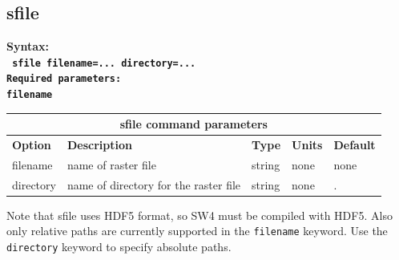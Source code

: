 \documentclass[11pt]{report}
\begin{document}
\subsection{sfile}
\label{keyword:sfile}
\begin{flushleft}\bf
Syntax:\\
\tt
sfile filename=... directory=...\\

\bf Required parameters:\\
\tt filename
\end{flushleft}
%
\begin{center}
\begin{tabular}{|l|p{8cm}|l|l||l|} \hline
\multicolumn{5}{|c|}{\bf sfile command parameters}\\ \hline
{\bf Option} & {\bf Description}                        & {\bf Type} & {\bf Units} & {\bf Default} \\ \hline 
\hline
filename      & name of raster file                     & string  & none & none \\ \hline
directory     & name of directory for the raster file   & string  & none & . \\ \hline
\end{tabular}
\end{center}
Note that sfile uses HDF5 format, so SW4 must be compiled with HDF5. Also only relative paths are currently supported in the \verb+filename+ keyword. Use the
\verb+directory+ keyword to specify absolute paths.




%
\end{document}
